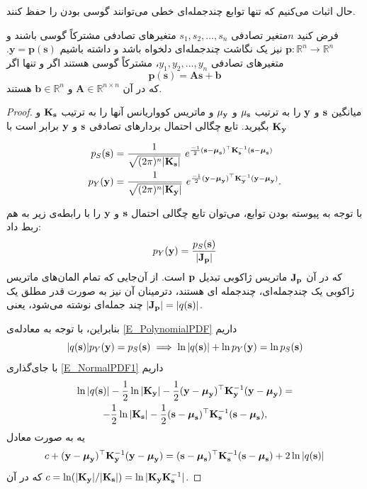 \documentclass[oneside]{thesis}
\begin{document}
حال اثبات می‌کنیم که تنها توابع چند‌جمله‌ای خطی می‌توانند گوسی بودن را حفظ کنند.

\begin{theorem}
	فرض کنید $n$متغیر تصادفی 
	$s_1, s_2, \dots, s_n$
	متغیرهای تصادفی مشترکاً گوسی باشند و 
	$\mathbf{p}: \mathbb{R}^n\to\mathbb{R}^n$
	نیز یک نگاشت چند‌جمله‌ای دلخواه باشد و داشته باشیم
	$\mathbf{y} = \mathbf{p}(\mathbf{s}) $.
	متغیرهای تصادفی 
	$y_1, y_2, \dots, y_n$،
	مشترکاً گوسی هستند اگر و تنها اگر
	$$\mathbf{p}(\mathbf{s}) = \mathbf{A}\mathbf{s} + \mathbf{b}$$
	که در آن 
	$\mathbf{A} \in \mathbb{R}^{n\times n}$
	و 
	$\mathbf{b} \in \mathbb{R}^n$
	هستند.
\end{theorem}

\begin{proof}
میانگین 
$\mathbf{s}$
و 
$\mathbf{y}$
را  به ترتیب
$\mu_{\mathbf{s}}$
و 
$\mu_{\mathbf{y}}$
و ماتریس کوواریانس آنها را به ترتیب
$\bf K_{\mathbf{s}}$
و
$\bf K_{\mathbf{y}}$
بگیرید. تابع چگالی احتمال بردارهای تصادفی 
$\mathbf{s}$
و 
$\mathbf{y}$
برابر است با

\begin{align}
\label{E_NormalPDF1}
p_S({\bf s}) &= \frac{1}{\sqrt{(2\pi)^n|{\bf K}_{\bf s}|}} \ e^{\frac{-1}{2}({\bf s}-\boldsymbol{\mu}_{\bf s})^\top{\bf K}_{\bf s}^{-1}({\bf s}-\boldsymbol{\mu}_{\bf s})} \\
\label{E_NormalPDF2}
p_Y({\bf y}) &= \frac{1}{\sqrt{(2\pi)^n|{\bf K}_{\bf y}|}} \ e^{\frac{-1}{2}({\bf y}-\boldsymbol{\mu}_{\bf y})^\top{\bf K}_{\bf y}^{-1}({\bf y}-\boldsymbol{\mu}_{\bf y})}.
\end{align}

با توجه به پیوسته بودن توابع، می‌توان تابع چگالی احتمال 
$\mathbf{s}$
و 
$\mathbf{y}$
 را با رابطه‌ی زیر به هم ربط داد:
 \begin{equation}
 \label{E_PolynomialPDF}
 p_Y({\bf y})=\frac{p_S({\bf s})}{|{\bf J}_{\bf p}|}
 \end{equation}
 که در آن
 ${\bf J}_{\bf p}$
 ماتریس ژاکوبی تبدیل $\bf p$ است. از آن‌جایی که تمام المان‌های ماتریس ژاکوبی یک چندجمله‌ای، چندجمله ای هستند، دترمینان آن نیز به صورت قدر مطلق یک چند جمله‌ای نوشته می‌شود، یعنی
 $|{\bf J}_{\bf p}| = |q(\mathbf{s})|$.

بنابراین، با توجه به معادله‌ی 
 \eqref{E_PolynomialPDF}
 داریم
 $$|q(\mathbf{s})| p_Y(\mathbf{y}) = p_S(\mathbf{s}) \implies \ln |q(\mathbf{s})| + \ln p_Y(\mathbf{y}) = \ln p_S(\mathbf{s})$$
 با جای‌گذاری 
 \eqref{E_NormalPDF1}
 داریم
 \begin{multline}
 \ln |q({\bf s})| - \frac{1}{2} \ln |{\bf K}_{\bf y}|
 - \frac{1}{2} ({\bf y}-\boldsymbol{\mu}_{\bf y})^\top{\bf K}_{\bf y}^{-1}({\bf y}-\boldsymbol{\mu}_{\bf y}) = \\ - \frac{1}{2} \ln |{\bf K}_{\bf s}|
 - \frac{1}{2} ({\bf s}-\boldsymbol{\mu}_{\bf s})^\top{\bf K}_{\bf s}^{-1}({\bf s}-\boldsymbol{\mu}_{\bf s}),
 \end{multline}
 یه به صورت معادل
 \begin{equation}
 \label{E_MainEQMainTheorem}
 c + ({\bf y}-\boldsymbol{\mu}_{\bf y})^\top{\bf K}_{\bf y}^{-1}({\bf y}-\boldsymbol{\mu}_{\bf y}) =
 ({\bf s}-\boldsymbol{\mu}_{\bf s})^\top{\bf K}_{\bf s}^{-1}({\bf s}-\boldsymbol{\mu}_{\bf s}) + 2\ln |q({\bf s})|
 \end{equation}
 که در آن
 $c =  \ln (|{\bf K}_{\bf y}|/|{\bf K}_{\bf s}|)=\ln |{\bf K}_{\bf y}{\bf K}_{\bf s}^{-1}|$.



\end{proof}
\end{document}
